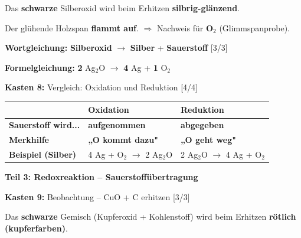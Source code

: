 \documentclass[10pt, a4paper]{article}
\newcommand{\lsg}[1]{\textcolor{loesung}{\textbf{#1}}}
\newcommand{\punktebox}[1]{\hfill\small\textcolor{mittelgrau}{[#1/#1]}}
\newcommand{\kasten}[2]{%
    \vspace{4pt}%
    \noindent\textbf{\textcolor{fachfarbe}{Kasten #1:}} #2%
    \vspace{2pt}%
    \nopagebreak[4]%
}
\begin{document}
\vspace{2pt}
Das \textbf{schwarze} Silberoxid wird beim Erhitzen \lsg{silbrig-glänzend}.

Der glühende Holzspan \lsg{flammt auf}. $\Rightarrow$ Nachweis für \lsg{O$_2$} (Glimmspanprobe).

\vspace{4pt}

\begin{merkkasten}
\textbf{Wortgleichung:} \lsg{Silberoxid} $\longrightarrow$ \lsg{Silber} + \lsg{Sauerstoff} \punktebox{3}

\vspace{3pt}
\textbf{Formelgleichung:} \lsg{2} Ag$_2$O $\longrightarrow$ \lsg{4} Ag + \lsg{1} O$_2$
\end{merkkasten}

\kasten{8}{Vergleich: Oxidation und Reduktion} \punktebox{4}

\vspace{2pt}
\begin{tabular}{|p{3.5cm}|p{5cm}|p{5cm}|}
\hline
& \textbf{Oxidation} & \textbf{Reduktion} \\
\hline
\textbf{Sauerstoff wird...} & \lsg{aufgenommen} & \lsg{abgegeben} \\
\hline
\textbf{Merkhilfe} & \lsg{„O kommt dazu"} & \lsg{„O geht weg"} \\
\hline
\textbf{Beispiel (Silber)} & 4 Ag + O$_2$ $\rightarrow$ 2 Ag$_2$O & 2 Ag$_2$O $\rightarrow$ 4 Ag + O$_2$ \\
\hline
\end{tabular}

\vspace{4pt}


\begin{teilbox}
\textbf{\textcolor{fachfarbe}{Teil 3: Redoxreaktion – Sauerstoffübertragung}}
\end{teilbox}

\vspace{-2pt}

\kasten{9}{Beobachtung – CuO + C erhitzen} \punktebox{3}

\vspace{2pt}
Das \textbf{schwarze} Gemisch (Kupferoxid + Kohlenstoff) wird beim Erhitzen \lsg{rötlich (kupferfarben)}.
\end{document}
